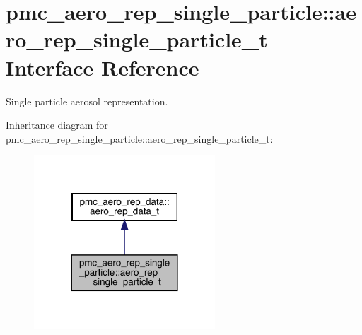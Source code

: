 \hypertarget{structpmc__aero__rep__single__particle_1_1aero__rep__single__particle__t}{}\section{pmc\+\_\+aero\+\_\+rep\+\_\+single\+\_\+particle\+:\+:aero\+\_\+rep\+\_\+single\+\_\+particle\+\_\+t Interface Reference}
\label{structpmc__aero__rep__single__particle_1_1aero__rep__single__particle__t}


Single particle aerosol representation.  




Inheritance diagram for pmc\+\_\+aero\+\_\+rep\+\_\+single\+\_\+particle\+:\+:aero\+\_\+rep\+\_\+single\+\_\+particle\+\_\+t\+:\nopagebreak
\begin{figure}[H]
\begin{center}
\leavevmode
\includegraphics[width=192pt]{structpmc__aero__rep__single__particle_1_1aero__rep__single__particle__t__inherit__graph}
\end{center}
\end{figure}
